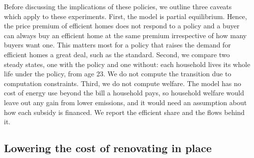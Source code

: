 Before discussing the implications of these policies, we outline three caveats which apply to these experiments. First, the model is partial
equilibrium. Hence, the price premium of efficient homes
does not respond to a policy and a buyer can always buy an efficient home at
the same premium irrespective of how many buyers want one. This matters most for a
policy that raises the demand for efficient homes a great deal, such as
the standard. Second, we compare two steady states, one with the policy
and one without: each household lives its whole life under the policy,
from age 23. We do not compute the transition due to computation constraints. Third, we do not compute welfare. The model has no cost of
energy use beyond the bill a household pays, so household welfare would
leave out any gain from lower emissions, and it would need an assumption
about how each subsidy is financed. We report the efficient share and the
flows behind it.


\subsection{Lowering the cost of renovating in place}\label{sec:policy-renovation}

